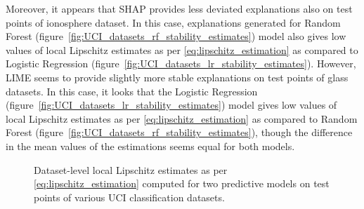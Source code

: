 \documentclass[english]{tktltiki2}
\theoremstyle{definition}
\theoremstyle{remark}
\begin{document}
Moreover, it appears that SHAP provides less deviated explanations also on test points of ionosphere dataset. In this case, explanations generated for Random Forest (figure~\ref{fig:UCI_datasets_rf_stability_estimates}) model also gives low values of local Lipschitz estimates as per \eqref{eq:lipschitz_estimation} as compared to Logistic Regression (figure~\ref{fig:UCI_datasets_lr_stability_estimates}). However, LIME seems to provide slightly more stable explanations on test points of glass datasets. In this case, it looks that the Logistic Regression (figure~\ref{fig:UCI_datasets_lr_stability_estimates}) model gives low values of local Lipschitz estimates as per \eqref{eq:lipschitz_estimation} as compared to Random Forest (figure~\ref{fig:UCI_datasets_rf_stability_estimates}), though the difference in the mean values of the estimations seems equal for both models.

\begin{figure}[H]
	\hspace*{\fill}%
	\caption{Dataset-level local Lipschitz estimates as per \eqref{eq:lipschitz_estimation} computed for two predictive models on test points of various UCI classification datasets.}%
	\label{fig:UCI_datasets_stability_estimates}%
\end{figure}


\end{document}
